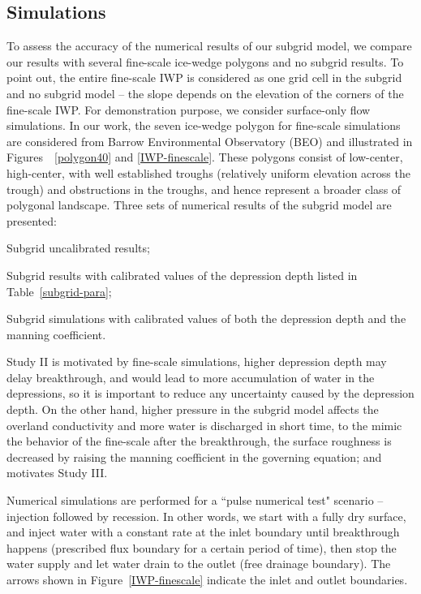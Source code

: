 \documentclass[review,11pt]{elsarticle}
\begin{document}
\subsection{Simulations}
To assess the accuracy of the numerical results of our subgrid model, we compare our results with several fine-scale ice-wedge polygons and no subgrid results. To point out, the entire fine-scale IWP is considered as one grid cell in the subgrid and no subgrid model -- the slope depends on the elevation of the corners of the fine-scale IWP. For demonstration purpose, we consider surface-only flow simulations. In our work, the seven ice-wedge polygon for fine-scale simulations are considered from Barrow Environmental Observatory (BEO) and illustrated in Figures~~\ref{polygon40} and \ref{IWP-finescale}. These polygons consist of low-center, high-center, with well established troughs (relatively uniform elevation across the trough) and obstructions in the troughs, and hence represent a broader class of polygonal landscape. Three sets of numerical results of the subgrid model are presented:

\begin{description}\itemsep0pt \parskip0pt
\item [Study I:] Subgrid uncalibrated results;
\item [Study II:] Subgrid results with calibrated values of the depression depth listed in Table~\ref{subgrid-para};
\item [Study III:] Subgrid simulations with calibrated values of both the depression depth and the manning coefficient.
\end{description}

Study II is motivated by fine-scale simulations, higher depression depth may delay breakthrough, and would lead to more accumulation of water in the depressions, so it is important to reduce any uncertainty caused by the depression depth. On the other hand, higher pressure in the subgrid model affects the overland conductivity and more water is discharged in short time, to the mimic the behavior of the fine-scale after the breakthrough, the surface roughness is decreased by raising the manning coefficient in the governing equation; and motivates Study III.

Numerical simulations are performed for a  ``pulse numerical test" scenario -- injection followed by recession. In other words, we start with a fully dry surface, and inject water with a constant rate at the inlet boundary until breakthrough happens (prescribed flux boundary for a certain period of time), then stop the water supply and let water drain to the outlet (free drainage boundary). The arrows shown in Figure~\ref{IWP-finescale} indicate the inlet and outlet boundaries.
\end{document}

